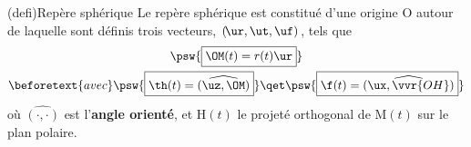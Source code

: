 \documentclass[../../main/main.tex]{subfiles}
\begin{document}
\begin{tcb*}[sidebyside, righthand ratio=.35](defi){Repère sphérique}
	Le repère sphérique est constitué d'une origine O autour de laquelle sont
	définis trois vecteurs, $(\!\ur, \ut, \uf)$, tels que
	\begin{gather*}
		\psw{\boxed{\OM(t) = r(t)\ur}}
		\\\beforetext{avec}
		\psw{\boxed{\th(t) = \widehat{(\uz,\OM)}}}
		\qet
		\psw{\boxed{\f(t) = \widehat{(\ux,\vvr{OH})}}}
	\end{gather*}
	où $\widehat{(\cdot, \cdot)}$ est l'\textbf{angle orienté}, et H$(t)$ le
	projeté orthogonal de M$(t)$ sur le plan polaire.
	\smallbreak
	\tcblower
	\begin{center}
\end{center}
\end{tcb*}
\end{document}
